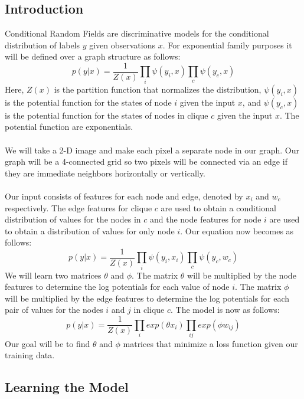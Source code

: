 \subsection{Introduction}

Conditional Random Fields are discriminative models for the conditional distribution of labels $y$ given observations $x$. For exponential family purposes it will be defined over a graph structure as follows:
\[
p(y|x) = \frac{1}{Z(x)} \prod_i{\psi(y_i,x)} \prod_{c}{\psi(y_c,x)}
\]
Here, $Z(x)$ is the partition function that normalizes the distribution, $\psi(y_i,x)$ is the potential function for the states of node $i$ given the input $x$, and $\psi(y_c,x)$ is the potential function for the states of nodes in clique $c$ given the input $x$. The potential function are exponentials.\\
\\
We will take a 2-D image and make each pixel a separate node in our graph. Our graph will be a 4-connected grid so two pixels will be connected via an edge if they are immediate neighbors horizontally or vertically. \\
\\
Our input consists of features for each node and edge, denoted by $x_i$ and $w_c$ respectively. The edge features for clique $c$ are used to obtain a conditional distribution of values for the nodes in $c$ and the node features for node $i$ are used to obtain a distribution of values for only node $i$. Our equation now becomes as follows:
\[
p(y|x) = \frac{1}{Z(x)} \prod_i{\psi(y_i,x_i)} \prod_{c}{\psi(y_c,w_c)}
\]
We will learn two matrices $\theta$ and $\phi$. The matrix $\theta$ will be multiplied by the node features to determine the log potentials for each value of node $i$. The matrix $\phi$ will be multiplied by the edge features to determine the log potentials for each pair of values for the nodes $i$ and $j$ in clique $c$. The model is now as follows:
\[
p(y|x) = \frac{1}{Z(x)} \prod_i{exp(\theta x_i)} \prod_{ij}{exp(\phi w_{ij})}
\]
Our goal will be to find $\theta$ and $\phi$ matrices that minimize a loss function given our training data. 

\subsection{Learning the Model}

